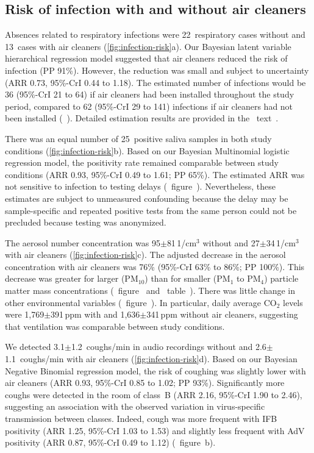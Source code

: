 \documentclass[fleqn,11pt]{wlscirep}
\begin{document}
\subsection{Risk of infection with and without air cleaners}

Absences related to respiratory infections were 22~respiratory cases without and 13~cases with air cleaners (\cref{fig:infection-risk}a). Our Bayesian latent variable hierarchical regression model suggested that air cleaners reduced the risk of infection (PP 91\%). However, the reduction was small and subject to uncertainty (ARR 0.73, 95\%-CrI 0.44 to 1.18). The estimated number of infections would be 36 (95\%-CrI 21 to 64) if air cleaners had been installed throughout the study period, compared to 62 (95\%-CrI 29 to 141) infections if air cleaners had not been installed (\supp~). Detailed estimation results are provided in the \supp~text~. 

There was an equal number of 25~positive saliva samples in both study conditions (\cref{fig:infection-risk}b). Based on our Bayesian Multinomial logistic regression model, the positivity rate remained comparable between study conditions (ARR 0.93, 95\%-CrI 0.49 to 1.61; PP 65\%). The estimated ARR was not sensitive to infection to testing delays (\supp~figure~). Nevertheless, these estimates are subject to unmeasured confounding because the delay may be sample-specific and repeated positive tests from the same person could not be precluded because testing was anonymized.

The aerosol number concentration was 95$\pm$81\,1/cm$^3$ without and 27$\pm$34\,1/cm$^3$ with air cleaners (\cref{fig:infection-risk}c). The adjusted decrease in the aerosol concentration with air cleaners was 76\% (95\%-CrI 63\% to 86\%; PP 100\%). This decrease was greater for larger (PM$_{10}$) than for smaller (PM$_1$ to PM$_{4}$) particle matter mass concentrations  (\supp~figure~ and \supp~table~). There was little change in other environmental variables (\supp~figure~). In particular, daily average CO$_2$ levels were 1,769$\pm$391\,ppm with and 1,636$\pm$341\,ppm without air cleaners, suggesting that ventilation was comparable between study conditions.

We detected 3.1$\pm$1.2~coughs/min in audio recordings without and 2.6$\pm$1.1~coughs/min with air cleaners (\cref{fig:infection-risk}d). Based on our Bayesian Negative Binomial regression model, the risk of coughing was slightly lower with air cleaners (ARR 0.93, 95\%-CrI 0.85 to 1.02; PP 93\%). Significantly more coughs were detected in the room of class~B (ARR 2.16, 95\%-CrI 1.90 to 2.46), suggesting an association with the observed variation in virus-specific transmission between classes. Indeed, cough was more frequent with IFB positivity (ARR 1.25, 95\%-CrI 1.03 to 1.53) and slightly less frequent with AdV positivity (ARR 0.87, 95\%-CrI 0.49 to 1.12) (\supp~figure~b). 
\end{document}
